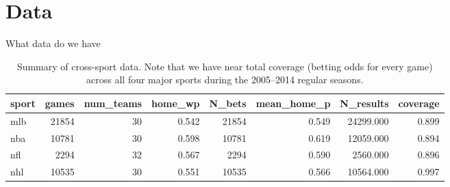 \documentclass{beamer}\usepackage[]{graphicx}\usepackage[]{color}
\begin{document}
\section{Data}
\begin{frame}[fragile]{What data do we have}
\tiny
\begin{table}[ht]
\centering
\begin{tabular}{lrrrrrrr}
  \hline
sport & games & num\_teams & home\_wp & N\_bets & mean\_home\_p & N\_results & coverage \\ 
  \hline
mlb & 21854 &   30 & 0.542 & 21854 & 0.549 & 24299.000 & 0.899 \\ 
  nba & 10781 &   30 & 0.598 & 10781 & 0.619 & 12059.000 & 0.894 \\ 
  nfl & 2294 &   32 & 0.567 & 2294 & 0.590 & 2560.000 & 0.896 \\ 
  nhl & 10535 &   30 & 0.551 & 10535 & 0.566 & 10564.000 & 0.997 \\ 
   \hline
\end{tabular}
\caption{Summary of cross-sport data. Note that we have near total coverage (betting odds for every game) across all four major sports during the 2005--2014 regular seasons.} 
\label{tab:bigfour}
\end{table}


\end{frame}
\end{document}
